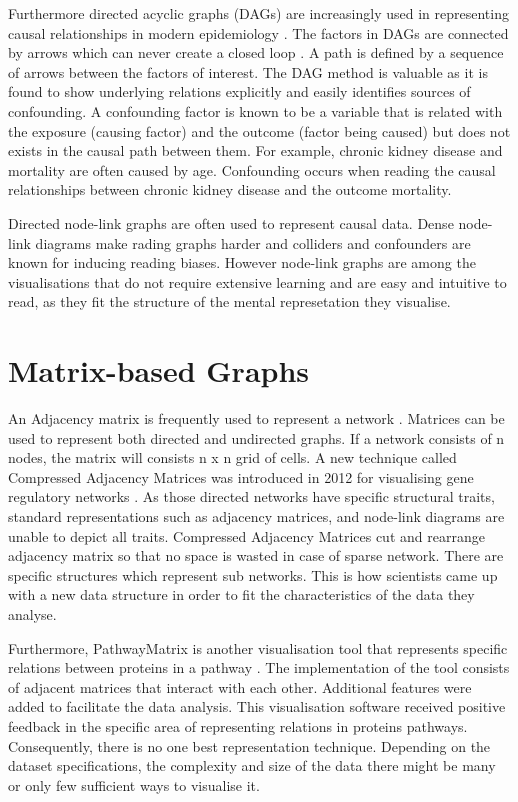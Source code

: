 \documentclass{l4proj}
\begin{document}
Furthermore directed acyclic graphs (DAGs) are increasingly used in representing causal relationships in modern epidemiology \cite{suttorp2015graphical}. The factors in DAGs are connected by arrows which can never create a closed loop \cite{greenland1999causal}. A path is defined by a sequence of arrows between the factors of interest. The DAG method is valuable as it is found to show underlying relations explicitly and easily identifies sources of confounding. A confounding factor is known to be a variable that is related with the exposure (causing factor) and the outcome (factor being caused) but does not exists in the causal path between them. For example, chronic kidney disease and mortality are often caused by age. Confounding occurs when reading the causal relationships between chronic kidney disease and the outcome mortality. 

Directed node-link graphs are often used to represent causal data. Dense node-link diagrams make rading graphs harder and colliders and confounders are known for inducing reading biases. However node-link graphs are among the visualisations that do not require extensive learning and are easy and intuitive to read, as they fit the structure of the mental represetation they visualise\cite{netzel2014comparative}.

\section{Matrix-based Graphs}

An Adjacency matrix is frequently used to represent a network \cite{longabaugh2012combing}. Matrices can be used to represent both directed and undirected graphs. If a network consists of n nodes, the matrix will consists n x n grid of cells. A new technique called Compressed Adjacency Matrices was introduced in 2012 for visualising gene regulatory networks \cite{dinkla2012compressed}. As those directed networks have specific structural traits, standard representations such as adjacency matrices, and node-link diagrams are unable to depict all traits. Compressed Adjacency Matrices cut and rearrange adjacency matrix so that no space is wasted in case of sparse network. There are specific structures which represent sub networks. This is how scientists came up with a new data structure in order to fit the characteristics of the data they analyse.

Furthermore, PathwayMatrix is another visualisation tool that represents specific relations between proteins in a pathway \cite{dang2015pathwaymatrix}. The implementation of the tool consists of adjacent matrices that interact with each other. Additional features were added to facilitate the data analysis. This visualisation software received positive feedback in the specific area of representing relations in proteins pathways. Consequently, there is no one best representation technique. Depending on the dataset specifications, the complexity and size of the data there might be many or only few sufficient ways to visualise it.       
\end{document}
